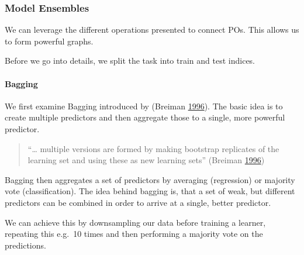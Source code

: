 \documentclass[]{article}
\newenvironment{Shaded}{\begin{snugshade}}{\end{snugshade}}
\newcommand{\DecValTok}[1]{\textcolor[rgb]{0.00,0.00,0.81}{#1}}
\newcommand{\KeywordTok}[1]{\textcolor[rgb]{0.13,0.29,0.53}{\textbf{#1}}}
\newcommand{\NormalTok}[1]{#1}
\newcommand{\OperatorTok}[1]{\textcolor[rgb]{0.81,0.36,0.00}{\textbf{#1}}}
\newcommand{\StringTok}[1]{\textcolor[rgb]{0.31,0.60,0.02}{#1}}
\let\oldparagraph\paragraph
\renewcommand{\paragraph}[1]{\oldparagraph{#1}\mbox{}}
\renewenvironment{Shaded} {\begin{snugshade}\small} {\end{snugshade}}
\begin{document}
\hypertarget{pipe-model-ensembles}{%
\subsubsection{Model Ensembles}\label{pipe-model-ensembles}}

We can leverage the different operations presented to connect POs.
This allows us to form powerful graphs.

Before we go into details, we split the task into train and test indices.

\begin{Shaded}
\end{Shaded}

\hypertarget{pipe-model-ensembles-bagging}{%
\paragraph{Bagging}\label{pipe-model-ensembles-bagging}}

We first examine Bagging introduced by (Breiman \protect\hyperlink{ref-Breiman1996}{1996}).
The basic idea is to create multiple predictors and then aggregate those to a single, more powerful predictor.

\begin{quote}
``\ldots{} multiple versions are formed
by making bootstrap replicates of the learning set
and using these as new learning sets'' (Breiman \protect\hyperlink{ref-Breiman1996}{1996})
\end{quote}

Bagging then aggregates a set of predictors by averaging (regression) or majority vote (classification).
The idea behind bagging is, that a set of weak, but different predictors can be combined in order to arrive at a single, better predictor.

We can achieve this by downsampling our data before training a learner, repeating this e.g.~10 times and then performing a majority vote on the predictions.
\end{document}
